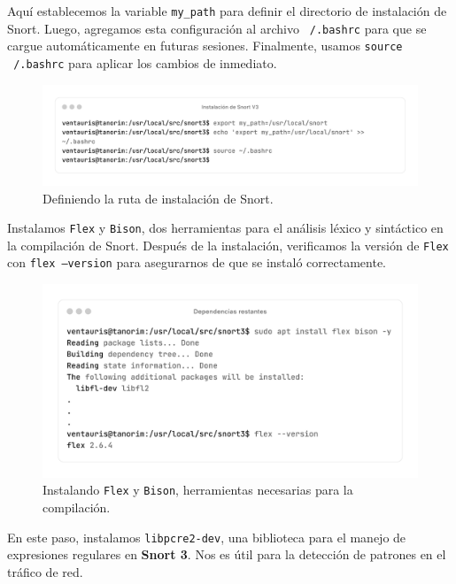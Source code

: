 \documentclass[11pt,a4paper,twoside]{report}
\begin{document}
Aquí establecemos la variable \texttt{my\_path} para definir el directorio de instalación de Snort. Luego, agregamos esta configuración al archivo \texttt{~/.bashrc} para que se cargue automáticamente en futuras sesiones. Finalmente, usamos \texttt{source ~/.bashrc} para aplicar los cambios de inmediato.

\begin{figure}[H]
	\centering
	\includegraphics[scale=0.12]{instalacion_snort/18-18.png}
	\caption{Definiendo la ruta de instalación de Snort.}
\end{figure}

\newpage

Instalamos \texttt{Flex} y \texttt{Bison}, dos herramientas para el análisis léxico y sintáctico en la compilación de Snort. Después de la instalación, verificamos la versión de \texttt{Flex} con \texttt{flex --version} para asegurarnos de que se instaló correctamente.

\begin{figure}[H]
	\centering
	\includegraphics[scale=0.12]{instalacion_snort/19-19.png}
	\caption{Instalando \texttt{Flex} y \texttt{Bison}, herramientas necesarias para la compilación.}
\end{figure}

En este paso, instalamos \texttt{libpcre2-dev}, una biblioteca para el manejo de expresiones regulares en \textbf{Snort 3}. Nos es útil para la detección de patrones en el tráfico de red.
\end{document}
